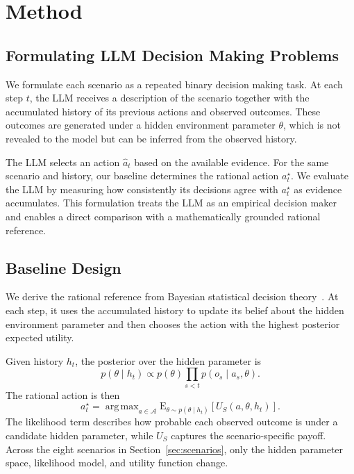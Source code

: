 \documentclass[letterpaper]{article} %
\begin{document}
\subsection{}

\subsection{}

\section{Method}

\subsection{Formulating LLM Decision Making Problems}

We formulate each scenario as a repeated binary decision making task. At
each step \(t\), the LLM receives a description of the scenario together
with the accumulated history of its previous actions and observed
outcomes. These outcomes are generated under a hidden environment
parameter \(\theta\), which is not revealed to the model but can be
inferred from the observed history.

The LLM selects an action \(\hat{a}_t\) based on the available evidence.
For the same scenario and history, our baseline determines the rational
action \(a_t^\star\). We evaluate the LLM by measuring how consistently
its decisions agree with \(a_t^\star\) as evidence accumulates. This
formulation treats the LLM as an empirical decision maker and enables a
direct comparison with a mathematically grounded rational reference.

\subsection{Baseline Design}
\label{sec:baseline-design}

We derive the rational reference from Bayesian statistical decision
theory~\citep{TODO_WALD}. At each step, it uses the accumulated history
to update its belief about the hidden environment parameter and then
chooses the action with the highest posterior expected utility.

Given history \(h_t\), the posterior over the hidden parameter is
\begin{equation}
    p(\theta \mid h_t)
    \propto
    p(\theta)
    \prod_{s<t}
    p(o_s \mid a_s,\theta).
\end{equation}
The rational action is then
\begin{equation}
    a_t^\star
    =
    \mathop{\mathrm{arg\,max}}_{a\in\mathcal{A}}
    \mathrm{E}_{\theta\sim p(\theta\mid h_t)}
    \left[U_S(a,\theta,h_t)\right].
\end{equation}
The likelihood term describes how probable each observed outcome is
under a candidate hidden parameter, while \(U_S\) captures the
scenario-specific payoff. Across the eight scenarios in
Section~\ref{sec:scenarios}, only the hidden parameter space, likelihood
model, and utility function change.
\end{document}
